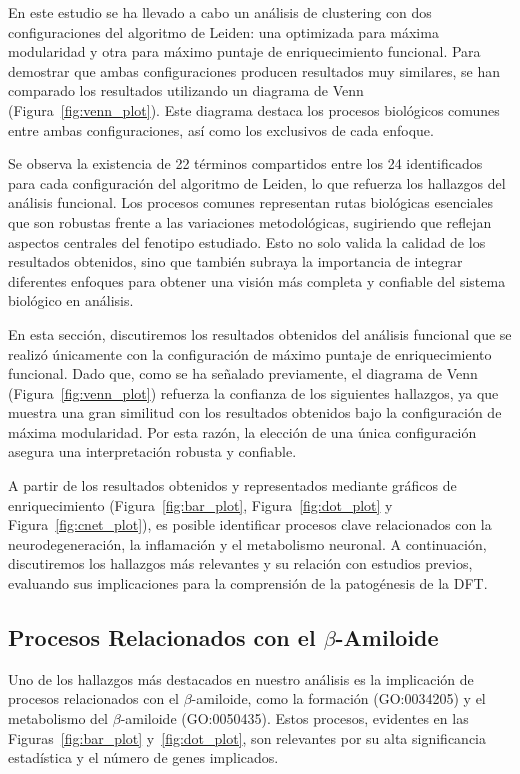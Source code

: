En este estudio se ha llevado a cabo un análisis de clustering con dos configuraciones del algoritmo de Leiden: una optimizada para máxima modularidad y otra para máximo puntaje de enriquecimiento funcional. Para demostrar que ambas configuraciones producen resultados muy similares, se han comparado los resultados utilizando un diagrama de Venn (Figura~\ref{fig:venn_plot}). Este diagrama destaca los procesos biológicos comunes entre ambas configuraciones, así como los exclusivos de cada enfoque.

Se observa la existencia de 22 términos compartidos entre los 24 identificados para cada configuración del algoritmo de Leiden, lo que refuerza los hallazgos del análisis funcional. Los procesos comunes representan rutas biológicas esenciales que son robustas frente a las variaciones metodológicas, sugiriendo que reflejan aspectos centrales del fenotipo estudiado. Esto no solo valida la calidad de los resultados obtenidos, sino que también  subraya la importancia de integrar diferentes enfoques para obtener una visión más completa y confiable del sistema biológico en análisis.

En esta sección, discutiremos los resultados obtenidos del análisis funcional que se realizó únicamente con la configuración de máximo puntaje de enriquecimiento funcional. Dado que, como se ha señalado previamente, el diagrama de Venn (Figura~\ref{fig:venn_plot}) refuerza la confianza de los siguientes hallazgos, ya que muestra una gran similitud con los resultados obtenidos bajo la configuración de máxima modularidad. Por esta razón, la elección de una única configuración asegura una interpretación robusta y confiable.

A partir de los resultados obtenidos y representados mediante gráficos de enriquecimiento (Figura~\ref{fig:bar_plot}, Figura~\ref{fig:dot_plot} y Figura~\ref{fig:cnet_plot}), es posible identificar procesos clave relacionados con la neurodegeneración, la inflamación y el metabolismo neuronal. A continuación, discutiremos los hallazgos más relevantes y su relación con estudios previos, evaluando sus implicaciones para la comprensión de la patogénesis de la DFT.

\subsection{Procesos Relacionados con el \(\beta\)-Amiloide}

Uno de los hallazgos más destacados en nuestro análisis es la implicación de procesos relacionados con el \(\beta\)-amiloide, como la formación (GO:0034205) y el metabolismo del \(\beta\)-amiloide (GO:0050435). Estos procesos, evidentes en las Figuras~\ref{fig:bar_plot} y~\ref{fig:dot_plot}, son relevantes por su alta significancia estadística y el número de genes implicados.

